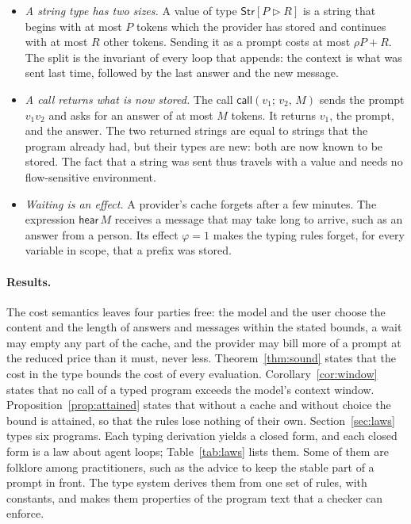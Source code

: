 \documentclass[acmsmall,nonacm,screen]{acmart}
\newcommand{\kw}[1]{\mathsf{#1}}
\newcommand{\Str}[2]{\kw{Str}[#1 \triangleright #2]}
\newcommand{\hear}[1]{\kw{hear}\,#1}
\newcommand{\call}[3]{\kw{call}(#1;\,#2,\,#3)}
\begin{document}
\begin{itemize}
\item \emph{A string type has two sizes.} A value of type $\Str{P}{R}$ is a string that begins
with at most $P$ tokens which the provider has stored and continues with at most $R$ other
tokens. Sending it as a prompt costs at most $\rho P + R$. The split is the invariant of every
loop that appends: the context is what was sent last time, followed by the last answer and the
new message.
\item \emph{A call returns what is now stored.} The call $\call{v_1}{v_2}{M}$ sends the prompt
$v_1v_2$ and asks for an answer of at most $M$ tokens. It returns $v_1$, the prompt, and the
answer. The two returned strings are equal to strings that the program already had, but their
types are new: both are now known to be stored. The fact that a string was sent thus travels
with a value and needs no flow-sensitive environment.
\item \emph{Waiting is an effect.} A provider's cache forgets after a few minutes. The
expression $\hear{M}$ receives a message that may take long to arrive, such as an answer from a
person. Its effect $\varphi = 1$ makes the typing rules forget, for every variable in scope,
that a prefix was stored.
\end{itemize}

\paragraph{Results.} The cost semantics leaves four parties free: the model and the user choose
the content and the length of answers and messages within the stated bounds, a wait may empty
any part of the cache, and the provider may bill more of a prompt at the reduced price than it
must, never less. Theorem~\ref{thm:sound} states that the cost in the type bounds the cost of
every evaluation. Corollary~\ref{cor:window} states that no call of a typed program exceeds the
model's context window. Proposition~\ref{prop:attained} states that without a cache and without
choice the bound is attained, so that the rules lose nothing of their own.
Section~\ref{sec:laws} types six programs. Each typing derivation yields a closed form, and
each closed form is a law about agent loops; Table~\ref{tab:laws} lists them. Some of them are
folklore among practitioners, such as the advice to keep the stable part of a prompt in front.
The type system derives them from one set of rules, with constants, and makes them properties
of the program text that a checker can enforce.
\end{document}
